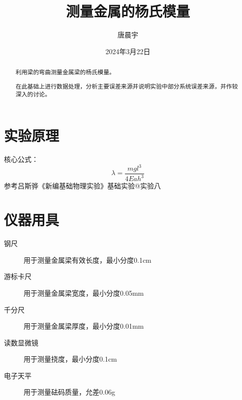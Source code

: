 \documentclass[12pt, a4paper]{ctexart}
\makeatletter
\newcommand{\Rmnum}[1]{\expandafter\@slowromancap\romannumeral #1@}
\makeatother
\begin{document}
\title{测量金属的杨氏模量}
\author{唐晨宇 }
\date{2024年3月22日}

\maketitle

\begin{abstract}
	利用梁的弯曲测量金属梁的杨氏模量。

    在此基础上进行数据处理，分析主要误差来源并说明实验中部分系统误差来源，并作较深入的讨论。
\end{abstract}
	
\tableofcontents

\clearpage

\pagestyle{headings}

\section{实验原理}
核心公式：
\[
	\lambda = \frac{mgl^3}{4Eah^3}
\]
参考吕斯骅《新编基础物理实验》基础实验\Rmnum{1}\quad 实验八

\section{仪器用具}
\begin{description}
	\item[钢尺] 用于测量金属梁有效长度，最小分度0.1cm
	\item[游标卡尺] 用于测量金属梁宽度，最小分度0.05mm
	\item[千分尺] 用于测量金属梁厚度，最小分度0.01mm
	\item[读数显微镜] 用于测量挠度，最小分度0.1cm
	\item[电子天平] 用于测量砝码质量，允差0.06g
\end{description}
\end{document}
